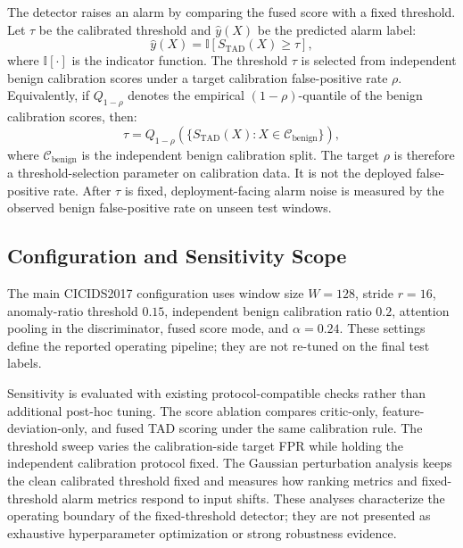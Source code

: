 The detector raises an alarm by comparing the fused score with a fixed threshold. Let \(\tau\) be the calibrated threshold and \(\hat{y}(X)\) be the predicted alarm label:
\begin{equation}
\hat{y}(X)=\mathbb{I}\left[S_{\mathrm{TAD}}(X)\ge\tau\right],
\end{equation}
where \(\mathbb{I}[\cdot]\) is the indicator function. The threshold \(\tau\) is selected from independent benign calibration scores under a target calibration false-positive rate \(\rho\). Equivalently, if \(Q_{1-\rho}\) denotes the empirical \((1-\rho)\)-quantile of the benign calibration scores, then:
\begin{equation}
\tau = Q_{1-\rho}\left(\{S_{\mathrm{TAD}}(X): X\in\mathcal{C}_{\mathrm{benign}}\}\right),
\end{equation}
where \(\mathcal{C}_{\mathrm{benign}}\) is the independent benign calibration split. The target \(\rho\) is therefore a threshold-selection parameter on calibration data. It is not the deployed false-positive rate. After \(\tau\) is fixed, deployment-facing alarm noise is measured by the observed benign false-positive rate on unseen test windows.

\subsection{Configuration and Sensitivity Scope}

The main CICIDS2017 configuration uses window size \(W=128\), stride \(r=16\), anomaly-ratio threshold \(0.15\), independent benign calibration ratio \(0.2\), attention pooling in the discriminator, fused score mode, and \(\alpha=0.24\). These settings define the reported operating pipeline; they are not re-tuned on the final test labels.

Sensitivity is evaluated with existing protocol-compatible checks rather than additional post-hoc tuning. The score ablation compares critic-only, feature-deviation-only, and fused TAD scoring under the same calibration rule. The threshold sweep varies the calibration-side target FPR while holding the independent calibration protocol fixed. The Gaussian perturbation analysis keeps the clean calibrated threshold fixed and measures how ranking metrics and fixed-threshold alarm metrics respond to input shifts. These analyses characterize the operating boundary of the fixed-threshold detector; they are not presented as exhaustive hyperparameter optimization or strong robustness evidence.

